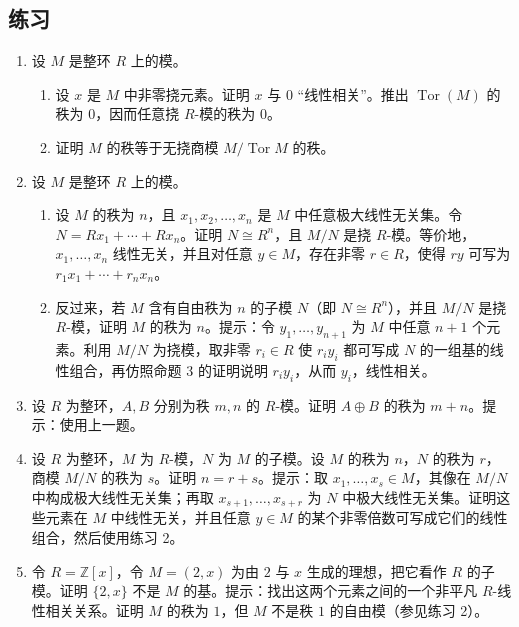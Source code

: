 \subsection*{练习}

\begin{enumerate}[label=\arabic*.]
\item 设 $M$ 是整环 $R$ 上的模。
\begin{enumerate}[label=(\alph*)]
\item 设 $x$ 是 $M$ 中非零挠元素。证明 $x$ 与 $0$ ``线性相关''。推出 $\operatorname{Tor}(M)$ 的秩为 $0$，因而任意挠 $R$-模的秩为 $0$。
\item 证明 $M$ 的秩等于无挠商模 $M/\operatorname{Tor}M$ 的秩。
\end{enumerate}

\item 设 $M$ 是整环 $R$ 上的模。
\begin{enumerate}[label=(\alph*)]
\item 设 $M$ 的秩为 $n$，且 $x_1,x_2,\ldots,x_n$ 是 $M$ 中任意极大线性无关集。令 $N=Rx_1+\cdots+Rx_n$。证明 $N\cong R^n$，且 $M/N$ 是挠 $R$-模。等价地，$x_1,\ldots,x_n$ 线性无关，并且对任意 $y\in M$，存在非零 $r\in R$，使得 $ry$ 可写为 $r_1x_1+\cdots+r_nx_n$。
\item 反过来，若 $M$ 含有自由秩为 $n$ 的子模 $N$（即 $N\cong R^n$），并且 $M/N$ 是挠 $R$-模，证明 $M$ 的秩为 $n$。提示：令 $y_1,\ldots,y_{n+1}$ 为 $M$ 中任意 $n+1$ 个元素。利用 $M/N$ 为挠模，取非零 $r_i\in R$ 使 $r_i y_i$ 都可写成 $N$ 的一组基的线性组合，再仿照命题 3 的证明说明 $r_i y_i$，从而 $y_i$，线性相关。
\end{enumerate}

\item 设 $R$ 为整环，$A,B$ 分别为秩 $m,n$ 的 $R$-模。证明 $A\oplus B$ 的秩为 $m+n$。提示：使用上一题。

\item 设 $R$ 为整环，$M$ 为 $R$-模，$N$ 为 $M$ 的子模。设 $M$ 的秩为 $n$，$N$ 的秩为 $r$，商模 $M/N$ 的秩为 $s$。证明 $n=r+s$。提示：取 $x_1,\ldots,x_s\in M$，其像在 $M/N$ 中构成极大线性无关集；再取 $x_{s+1},\ldots,x_{s+r}$ 为 $N$ 中极大线性无关集。证明这些元素在 $M$ 中线性无关，并且任意 $y\in M$ 的某个非零倍数可写成它们的线性组合，然后使用练习 2。

\item 令 $R=\mathbb Z[x]$，令 $M=(2,x)$ 为由 $2$ 与 $x$ 生成的理想，把它看作 $R$ 的子模。证明 $\{2,x\}$ 不是 $M$ 的基。提示：找出这两个元素之间的一个非平凡 $R$-线性相关关系。证明 $M$ 的秩为 $1$，但 $M$ 不是秩 $1$ 的自由模（参见练习 2）。


\end{enumerate}
